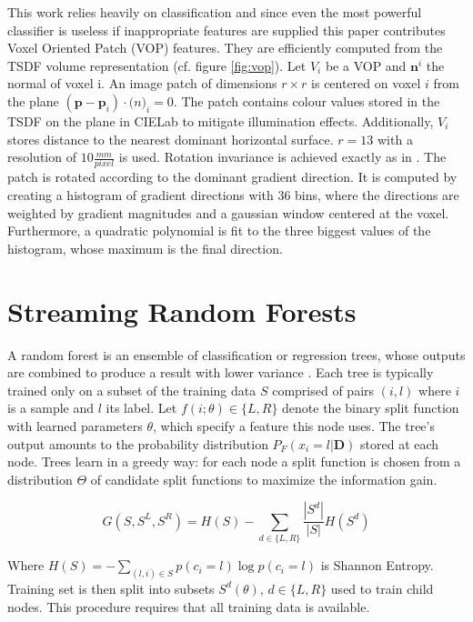 \documentclass{llncs}
\begin{document}
  This work relies heavily on classification and since even the most powerful classifier is useless if inappropriate features are supplied this paper contributes Voxel Oriented Patch (VOP) features. They are efficiently computed from the TSDF volume representation (cf. figure \ref{fig:vop}). Let $V_i$ be a VOP and $\mathbf{n}^i$ the normal of voxel i. An image patch of dimensions $r \times r$  is centered on voxel $i$ from the plane $(\mathbf{p} - \mathbf{p}_i) \cdot \mathbf(n)_i = 0$. The patch contains colour values stored in the TSDF on the plane in CIELab to mitigate illumination effects. Additionally, $V_i$ stores distance to the nearest dominant horizontal surface. $r = 13$ with a resolution of $10\frac{mm}{pixel}$ is used. Rotation invariance is achieved exactly as in \cite{sift}. The patch is rotated according to the dominant gradient direction. It is computed by creating a histogram of gradient directions with 36 bins, where the directions are weighted by gradient magnitudes and a gaussian window centered at the voxel. Furthermore, a quadratic polynomial is fit to the three biggest values of the histogram, whose maximum is the final direction. 

\section{Streaming Random Forests}
  
  A random forest is an ensemble of classification or regression trees, whose outputs are combined to produce a result with lower variance \cite{online_forest}. Each tree is typically trained only on a subset of the training data $S$ comprised of pairs $(i, l)$ where $i$ is a sample and $l$ its label.  Let $f(i; \theta) \in \{L, R\}$ denote the binary split function with learned parameters $\theta$, which specify a feature this node uses. The tree's output amounts to the probability distribution $P_F(x_i = l | \mathbf{D})$ stored at each node. Trees learn in a greedy way: for each node a split function is chosen from a distribution $\Theta$ of candidate split functions to maximize the information gain. 
  
  \begin{equation} \label{eq:infogain}
   G(S, S^L, S^R) = H(S) - \sum_{d \in \{L, R\}} \frac{|S^d|}{|S|}H(S^d)
  \end{equation}
  
  Where $H(S) = - \sum_{(l, i) \in S} p(c_i = l) \log{p(c_i = l)}$ is Shannon Entropy. Training set is then split into subsets $S^d(\theta)$, $d \in \{L, R\}$ used to train child nodes. This procedure requires that all training data is available.
  
\end{document}
